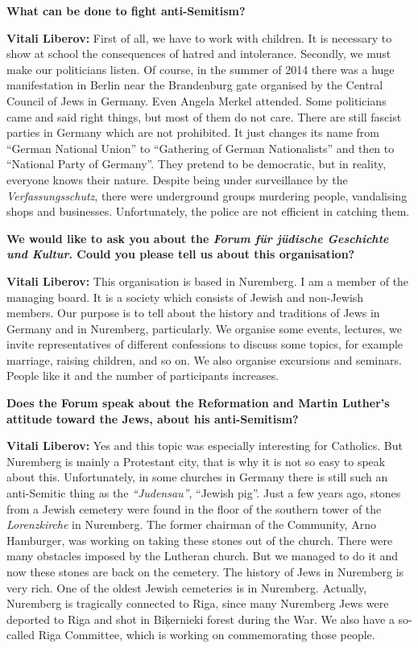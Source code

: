 \textbf{What can be done to fight anti-Semitism?} 

\textbf{Vitali Liberov:} First of all, we have to work with children. It is necessary to show at school the consequences of hatred and intolerance. Secondly, we must make our politicians listen. Of course, in the summer of 2014 there was a huge manifestation in Berlin near the Brandenburg gate organised by the Central Council of Jews in Germany. Even Angela Merkel attended. Some politicians came and said right things, but most of them do not care. There are still fascist parties in Germany which are not prohibited. It just changes its name from ``German National Union'' to ``Gathering of German Nationalists'' and then to ``National Party of Germany''. They pretend to be democratic, but in reality, everyone knows their nature. Despite being under surveillance by the \textit{Verfassungsschutz}, there were underground groups murdering people, vandalising shops and businesses. Unfortunately, the police are not efficient in catching them. 

\textbf{We would like to ask you about the \textit{Forum für jüdische Geschichte und Kultur}. Could you please tell us about this organisation?}  

\textbf{Vitali Liberov:} This organisation is based in Nuremberg. I am a member of the managing board. It is a society which consists of Jewish and non-Jewish members. Our purpose is to tell about the history and traditions of Jews in Germany and in Nuremberg, particularly. We organise some events, lectures, we invite representatives of different confessions to discuss some topics, for example marriage, raising children, and so on. We also organise excursions and seminars. People like it and the number of participants increases.  

\textbf{Does the Forum speak about the Reformation and Martin Luther’s attitude toward the Jews, about his anti-Semitism?} 

\textbf{Vitali Liberov:} Yes and this topic was especially interesting for Catholics. But Nuremberg is mainly a Protestant city, that is why it is not so easy to speak about this. Unfortunately, in some churches in Germany there is still such an anti-Semitic thing as the \textit{``Judensau''}, ``Jewish pig''. Just a few years ago, stones from a Jewish cemetery were found in the floor of the southern tower of the \textit{Lorenzkirche} in Nuremberg. The former chairman of the Community, Arno Hamburger, was working on taking these stones out of the church. There were many obstacles imposed by the Lutheran church. But we managed to do it and now these stones are back on the cemetery. The history of Jews in Nuremberg is very rich. One of the oldest Jewish cemeteries is in Nuremberg. Actually, Nuremberg is tragically connected to Riga, since many Nuremberg Jews were deported to Riga and shot in Biķernieki forest during the War. We also have a so-called Riga Committee, which is working on commemorating those people.